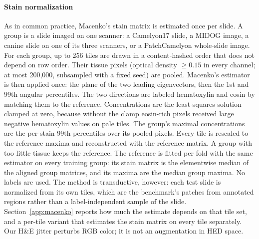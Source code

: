 \paragraph{Stain normalization} As in common practice, Macenko's stain matrix
\citep{macenko2009} is estimated once per slide. A group is a slide imaged on
one scanner: a Camelyon17 slide, a MIDOG image, a canine slide on one of its
three scanners, or a PatchCamelyon whole-slide image. For each group, up to 256
tiles are drawn in a content-hashed order that does not depend on row order.
Their tissue pixels (optical density $\ge0.15$ in every channel; at most
200,000, subsampled with a fixed seed) are pooled. Macenko's estimator is then
applied once: the plane of the two leading eigenvectors, then the 1st and 99th
angular percentiles. The two directions are labeled hematoxylin and eosin by
matching them to the reference. Concentrations are the least-squares solution
clamped at zero, because without the clamp eosin-rich pixels received large
negative hematoxylin values on pale tiles. The group's maximal concentrations
are the per-stain 99th percentiles over its pooled pixels. Every tile is
rescaled to the reference maxima and reconstructed with the reference matrix. A
group with too little tissue keeps the reference. The reference is fitted per
fold with the same estimator on every training group: its stain matrix is the
elementwise median of the aligned group matrices, and its maxima are the median
group maxima. No labels are used. The method is transductive, however: each
test slide is normalized from its own tiles, which are the benchmark's patches
from annotated regions rather than a label-independent sample of the slide.
Section~\ref{app:macenko} reports how much the estimate depends on that tile
set, and a per-tile variant that estimates the stain matrix on every tile
separately. Our H\&E jitter perturbs RGB color; it is not an augmentation in
HED space.

